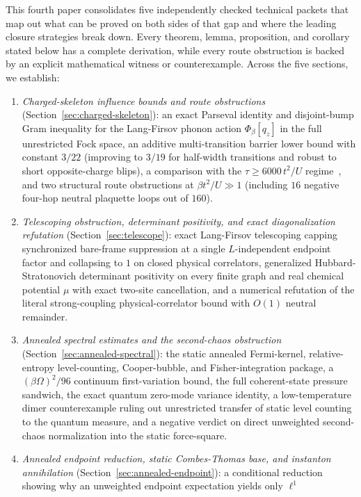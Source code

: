\documentclass[11pt]{article}
\theoremstyle{definition}
\theoremstyle{remark}
\begin{document}
This fourth paper consolidates five independently checked technical packets that
map out what can be proved on both sides of that gap and where the leading
closure strategies break down. Every theorem, lemma, proposition, and corollary
stated below has a complete derivation, while every route obstruction is backed
by an explicit mathematical witness or counterexample. Across the five
sections, we establish:
\begin{enumerate}[leftmargin=1.5em]
\item \emph{Charged-skeleton influence bounds and route obstructions}
(Section~\ref{sec:charged-skeleton}): an exact Parseval identity and
disjoint-bump Gram inequality for the Lang-Firsov phonon action $\Phi_\beta[q_z]$
in the full unrestricted Fock space, an additive multi-transition barrier lower
bound with constant $3/22$ (improving to $3/19$ for half-width transitions and
robust to short opposite-charge blips), a comparison with the
$\tau \ge 6000\,t^2/U$ regime~\cite{strong}, and two structural route
obstructions at $\beta t^2/U \gg 1$ (including $16$ negative four-hop neutral
plaquette loops out of $160$).
\item \emph{Telescoping obstruction, determinant positivity, and exact
diagonalization refutation} (Section~\ref{sec:telescope}): exact Lang-Firsov
telescoping capping synchronized bare-frame suppression at a single
$L$-independent endpoint factor and collapsing to $1$ on closed physical
correlators, generalized Hubbard-Stratonovich determinant positivity on every
finite graph and real chemical potential $\mu$ with exact two-site cancellation,
and a numerical refutation of the literal strong-coupling physical-correlator
bound with $O(1)$ neutral remainder.
\item \emph{Annealed spectral estimates and the second-chaos obstruction}
(Section~\ref{sec:annealed-spectral}): the static annealed Fermi-kernel,
relative-entropy level-counting, Cooper-bubble, and Fisher-integration
package, a $(\beta\Omega)^2/96$ continuum first-variation bound, the full
coherent-state pressure sandwich, the exact quantum zero-mode variance
identity, a low-temperature dimer counterexample ruling out unrestricted
transfer of static level counting to the quantum measure, and a negative
verdict on direct unweighted second-chaos normalization into the static
force-square.
\item \emph{Annealed endpoint reduction, static Combes-Thomas base, and
instanton annihilation} (Section~\ref{sec:annealed-endpoint}): a conditional
reduction showing why an unweighted endpoint expectation yields only $\ell^1$

\end{enumerate}
\end{document}
